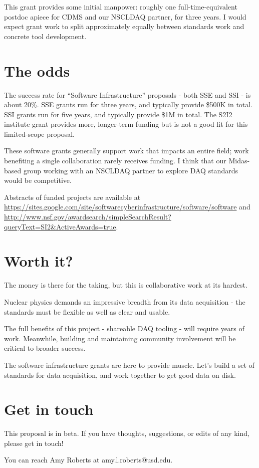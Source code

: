 \documentclass[]{report}   %
\begin{document}
This grant provides some initial manpower: roughly one full-time-equivalent postdoc apiece for CDMS and our NSCLDAQ partner, for three years.  I would expect grant work to split approximately equally between standards work and concrete tool development.



\section*{The odds}     %
The success rate for ``Software Infrastructure'' proposals - both SSE and SSI - is about 20\%. SSE grants run for three years, and typically
provide \$500K in total. SSI grants run for five years, and typically provide \$1M
in total.  The S2I2 institute grant provides more, longer-term funding but is not a good fit for this limited-scope proposal.
 
These software grants generally support work that impacts
an entire field; work benefiting a single collaboration rarely receives
funding. %
I think that our Midas-based group working with an NSCLDAQ partner to explore DAQ standards would be competitive.

Abstracts of funded projects are available at
\url{https://sites.google.com/site/softwarecyberinfrastructure/software/software} and
\url{http://www.nsf.gov/awardsearch/simpleSearchResult?queryText=SI2&ActiveAwards=true}.
 

 
\section*{Worth it?}     %
The money is there for the taking, but this is collaborative work at its hardest.  

Nuclear physics demands an impressive breadth from its data acquisition - the standards must be flexible as well as clear and usable.

The full benefits of this project - shareable DAQ tooling - will require years of work.  Meanwhile, building and maintaining community involvement will be critical to broader success.

The software infrastructure grants are here to provide muscle.  Let's build a set of standards for data acquisition, and work together %
to get good data on disk.

\section*{Get in touch}
This proposal is in beta.  If you have thoughts, suggestions, or edits of any kind, please get in touch!

You can reach Amy Roberts at amy.l.roberts@usd.edu.
\end{document}
